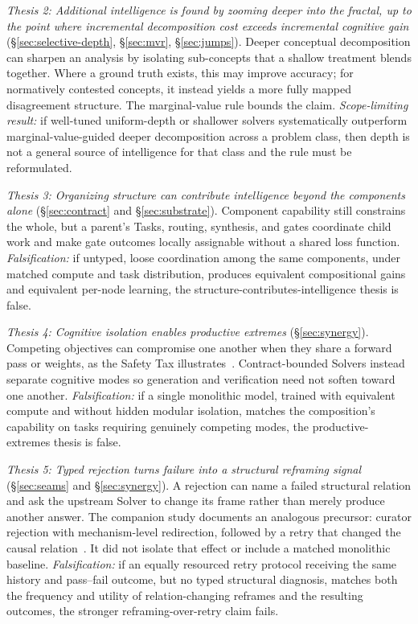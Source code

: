\documentclass[11pt]{article}
\begin{document}
\emph{Thesis 2: Additional intelligence is found by zooming deeper into the fractal, up to the point where incremental decomposition cost exceeds incremental cognitive gain} (\S\ref{sec:selective-depth}, \S\ref{sec:mvr}, \S\ref{sec:jumps}). Deeper conceptual decomposition can sharpen an analysis by isolating sub-concepts that a shallow treatment blends together. Where a ground truth exists, this may improve accuracy; for normatively contested concepts, it instead yields a more fully mapped disagreement structure. The marginal-value rule bounds the claim. \emph{Scope-limiting result:} if well-tuned uniform-depth or shallower solvers systematically outperform marginal-value-guided deeper decomposition across a problem class, then depth is not a general source of intelligence for that class and the rule must be reformulated.

\emph{Thesis 3: Organizing structure can contribute intelligence beyond the components alone} (\S\ref{sec:contract} and \S\ref{sec:substrate}). Component capability still constrains the whole, but a parent's Tasks, routing, synthesis, and gates coordinate child work and make gate outcomes locally assignable without a shared loss function. \emph{Falsification:} if untyped, loose coordination among the same components, under matched compute and task distribution, produces equivalent compositional gains and equivalent per-node learning, the structure-contributes-intelligence thesis is false.

\emph{Thesis 4: Cognitive isolation enables productive extremes} (\S\ref{sec:synergy}). Competing objectives can compromise one another when they share a forward pass or weights, as the Safety Tax illustrates~\cite{Huang2025}. Contract-bounded Solvers instead separate cognitive modes so generation and verification need not soften toward one another. \emph{Falsification:} if a single monolithic model, trained with equivalent compute and without hidden modular isolation, matches the composition's capability on tasks requiring genuinely competing modes, the productive-extremes thesis is false.

\emph{Thesis 5: Typed rejection turns failure into a structural reframing signal} (\S\ref{sec:seams} and \S\ref{sec:synergy}). A rejection can name a failed structural relation and ask the upstream Solver to change its frame rather than merely produce another answer. The companion study documents an analogous precursor: curator rejection with mechanism-level redirection, followed by a retry that changed the causal relation~\cite{westerberg2026ontology}. It did not isolate that effect or include a matched monolithic baseline. \emph{Falsification:} if an equally resourced retry protocol receiving the same history and pass--fail outcome, but no typed structural diagnosis, matches both the frequency and utility of relation-changing reframes and the resulting outcomes, the stronger reframing-over-retry claim fails.
\end{document}
